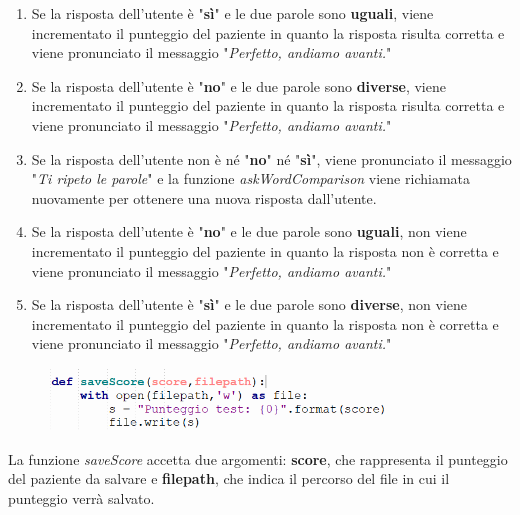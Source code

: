 \begin{sloppypar}
{\vspace{0.2cm}
\begin{enumerate}
    \item Se la risposta dell’utente è "\textbf{sì}" e le due parole sono \textbf{uguali}, viene incrementato
il punteggio del paziente in quanto la risposta risulta corretta e viene
pronunciato il messaggio "\textit{Perfetto, andiamo avanti.}"
\vspace{0.2cm}
\item Se la risposta dell’utente è "\textbf{no}" e le due parole sono \textbf{diverse}, viene incrementato
il punteggio del paziente in quanto la risposta risulta corretta e
viene pronunciato il messaggio "\textit{Perfetto, andiamo avanti.}"
\vspace{0.2cm}
\item Se la risposta dell’utente non è né "\textbf{no}" né "\textbf{sì}", viene pronunciato il messaggio
"\textit{Ti ripeto le parole}" e la funzione \textit{askWordComparison} viene richiamata nuovamente per ottenere una nuova risposta dall’utente.
\vspace{0.2cm}
\item Se la risposta dell’utente è "\textbf{no}" e le due parole sono \textbf{uguali}, non viene
incrementato il punteggio del paziente in quanto la risposta non è corretta
e viene pronunciato il messaggio "\textit{Perfetto, andiamo avanti.}"
\vspace{0.2cm}
\item Se la risposta dell’utente è "\textbf{sì}" e le due parole sono \textbf{diverse}, non viene
incrementato il punteggio del paziente in quanto la risposta non è corretta
e viene pronunciato il messaggio "\textit{Perfetto, andiamo avanti.}"
\end{enumerate}
\vspace{0.3cm}
\begin{figure}[H]
\centering
\includegraphics[width=0.8\textwidth]{immagini/lrs5.png}
\end{figure}
\vspace{0.3cm}
La funzione \textit{saveScore} accetta due argomenti: \textbf{score}, che rappresenta il punteggio
del paziente da salvare e \textbf{filepath}, che indica il percorso del file in cui il punteggio
verrà salvato.\newline
}
\end{sloppypar}
